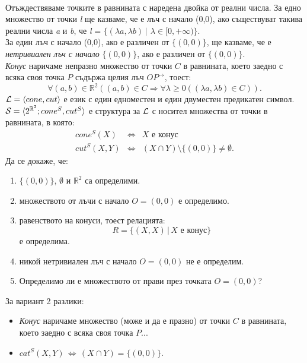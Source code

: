 \documentclass[12pt]{article}
\begin{document}
\paragraph{}
Отъждествяваме точките в равнината с наредена двойка от реални числа.
За едно множество от точки \textit{l} ще казваме, че е лъч с начало (0,0), ако съществуват такива реални числа \textit{a} и \textit{b}, че \textit{l} = $\{(\lambda a,\lambda b)\,|\,\ \lambda \in [0,+\infty)\}$.\\
За един лъч с начало (0,0), ако е различен от $\{(0,0)\}$, ще казваме, че е \textit{нетривиален лъч с начало} $\{(0,0)\}$, ако е различен от $\{(0,0)\}$.\\
\emph{Конус} наричаме непразно множество от точки $C$ в равнината, което заедно с всяка своя точка $P$ 
съдържа целия лъч $OP^{\rightarrow}$, тоест:
\begin{equation*}
\forall (a,b) \in \mathbb{R}^2 ((a,b)\in C \Rightarrow \forall \lambda\ge 0((\lambda a,\lambda b)\in C)).
\end{equation*}
 ${\cal L}=\langle cone,cut\rangle$ е език с един едноместен и един двуместен предикатен символ.
 ${\cal S}=\langle 2^{\mathbb{R}^2}; cone^{S},cut^{S}\rangle$ е структура за ${\cal L}$ с носител множества
 от точки в равнината, в която:
 \begin{eqnarray*}
    cone^{S}(X) &\iff & X \text{ е конус}\\
    cut^{S}(X,Y) &\iff & (X\cap Y)\setminus\{(0,0)\} \neq \emptyset.
 \end{eqnarray*}
 Да се докаже, че:
 \begin{enumerate}
    \item $\{(0,0)\}$, $\emptyset$ и $\mathbb{R}^2$ са определими.
    \item множеството от лъчи с начало $O=(0,0)$ е определимо.
    \item равенството на конуси, тоест релацията:
    \begin{equation*}
    R =\{(X,X) \,|\, X\text{ е конус}\}
    \end{equation*}
    е определима.
    \item никой нетривиален лъч с начало $O=(0,0)$ не е определим.
    \item  Определимо ли е множеството от прави през точката $O=(0,0)$? 
 \end{enumerate}
 За вариант 2 разлики:
 \begin{itemize}
     \item \emph{Конус} наричаме множество (може и да е празно) от точки $C$ в равнината, което заедно с всяка своя точка $P$...
     \item $cat^{S}(X,Y) \, \iff \, (X\cap Y)=\{(0,0)\}$.
 \end{itemize}
 
\end{document}
